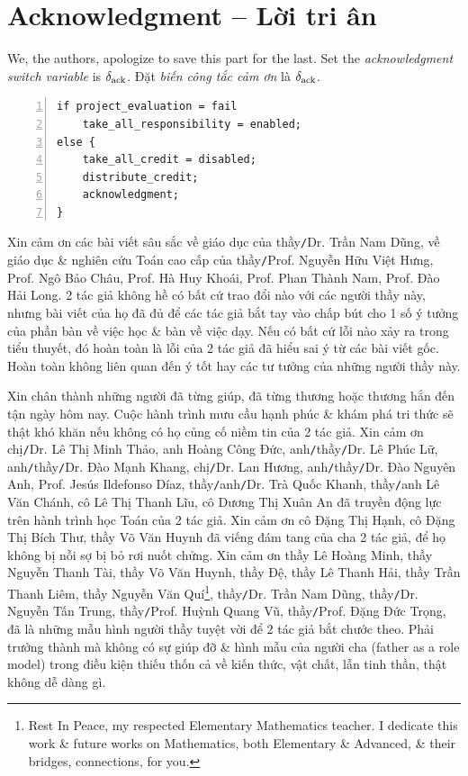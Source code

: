 \documentclass[12pt]{article}
\begin{document}

\appendix


\section{Acknowledgment -- Lời tri ân}
We, the authors, apologize to save this part for the last. Set the {\it acknowledgment switch variable} is $\delta_{\rm ack}$. Đặt {\it biến công tắc cảm ơn} là $\delta_{\rm ack}$.

\begin{Verbatim}[numbers=left,xleftmargin=5mm]
if project_evaluation = fail
    take_all_responsibility = enabled;
else {
    take_all_credit = disabled;
    distribute_credit;
    acknowledgment;
}
\end{Verbatim}
Xin cảm ơn các bài viết sâu sắc về giáo dục của thầy{\tt/}Dr. {\sc Trần Nam Dũng}, về giáo dục \& nghiên cứu Toán cao cấp của thầy{\tt/}Prof. {\sc Nguyễn Hữu Việt Hưng}, Prof. {\sc Ngô Bảo Châu}, Prof. {\sc Hà Huy Khoái}, Prof. {\sc Phan Thành Nam}, Prof. {\sc Đào Hải Long}. 2 tác giả không hề có bất cứ trao đổi nào với các người thầy này, nhưng bài viết của họ đã đủ để các tác giả bắt tay vào chấp bút cho 1 số ý tưởng của phần bàn về việc học \& bàn về việc dạy. Nếu có bất cứ lỗi nào xảy ra trong tiểu thuyết, đó hoàn toàn là lỗi của 2 tác giả đã hiểu sai ý từ các bài viết gốc. Hoàn toàn không liên quan đến ý tốt hay các tư tưởng của những người thầy này.

Xin chân thành những người đã từng giúp, đã từng thương hoặc thương hắn đến tận ngày hôm nay. Cuộc hành trình mưu cầu hạnh phúc \& khám phá tri thức sẽ thật khó khăn nếu không có họ củng cố niềm tin của 2 tác giả. Xin cảm ơn chị{\tt/}Dr. {\sc Lê Thị Minh Thảo}, anh {\sc Hoàng Công Đức}, anh{\tt/}thầy{\tt/}Dr. {\sc Lê Phúc Lữ}, anh{\tt/}thầy{\tt/}Dr.  {\sc Đào Mạnh Khang}, chị{\tt/}Dr.  {\sc Lan Hương}, anh{\tt/}thầy{\tt/}Dr.  {\sc Đào Nguyên Anh}, Prof. {\sc Jesús Ildefonso Díaz}, thầy{\tt/}anh{\tt/}Dr.  {\sc Trà Quốc Khanh}, thầy{\tt/}anh {\sc Lê Văn Chánh}, cô {\sc Lê Thị Thanh Lĩu}, cô {\sc Dương Thị Xuân An} đã truyền động lực trên hành trình học Toán của 2 tác giả. Xin cảm ơn cô {\sc Đặng Thị Hạnh}, cô {\sc Đặng Thị Bích Thư}, thầy {\sc Võ Văn Huynh} đã viếng đám tang của cha 2 tác giả, để họ không bị nỗi sợ bị bỏ rơi nuốt chửng. Xin cảm ơn thầy {\sc Lê Hoàng Minh}, thầy {\sc Nguyễn Thanh Tài}, thầy {\sc Võ Văn Huynh}, thầy {\sc Đệ}, thầy {\sc Lê Thanh Hải}, thầy {\sc Trần Thanh Liêm}, thầy {\sc Nguyễn Văn Quí}\footnote{Rest In Peace, my respected Elementary Mathematics teacher. I dedicate this work \& future works on Mathematics, both Elementary \& Advanced, \& their bridges, connections, for you.}, thầy{\tt/}Dr.  {\sc Trần Nam Dũng}, thầy{\tt/}Dr. {\sc Nguyễn Tấn Trung}, thầy{\tt/}Prof. {\sc Huỳnh Quang Vũ}, thầy{\tt/}Prof. {\sc Đặng Đức Trọng}, đã là những mẫu hình người thầy tuyệt vời để 2 tác giả bắt chước theo. Phải trưởng thành mà không có sự giúp đỡ \& hình mẫu của người cha (father as a role model) trong điều kiện thiếu thốn cả về kiến thức, vật chất, lẫn tinh thần, thật không dễ dàng gì.
\end{document}
